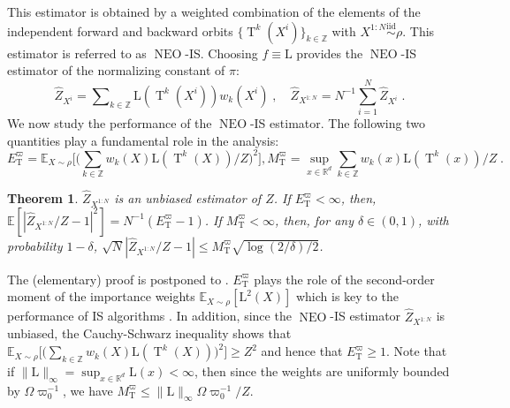 \documentclass{article}
\newtheorem{theorem}{Theorem}
\def\simiid{\overset{\operatorname{iid}}{\sim}}
\def\IFIS{\ensuremath{\operatorname{NEO}}}
\def\InFiNE{{\small \IFIS}}
\def\NEO{{\small \IFIS}}
\def\transfo{\operatorname{T}}
\def\PE{\mathbb{E}}
\def\rset{\mathbb{R}}
\def\eqsp{\,}
\def\eqsp{\;}
\newcommand{\1}{\mathds{1}}
\def\target{\pi}
\def\proposal{\rho}
\newcommand{\chunku}[3]{#1^{#2:#3}}
\def\const{Z}
\newcommand{\estConstC}[1]{\widehat{Z}_{#1}}
\def\rset{\mathbb{R}}
\def\zset{\mathbb{Z}}
\def\likelihood{\mathrm{L}}
\def\bound{M_{\transfo}^{\varpi}}
\begin{document}
This estimator is obtained by a weighted combination of  the elements of the independent forward and backward orbits $\{\transfo^k(X^i)\}_{k \in\zset}$ with $X^{1:N} \simiid \proposal$. This estimator is referred to as \NEO-IS. Choosing $f\equiv \likelihood$ provides the \InFiNE-IS estimator of the normalizing constant of $\target$:
\vspace{-0.05cm}
\begin{equation}  
\label{eq:def_estimator_normal_const} 
\textstyle \estConstC{X^i}=\sum\nolimits_{k\in\zset}\likelihood(\transfo^{k}(X^i))w_k(X^i)\eqsp, \quad
 \estConstC{X^{1:N}}=N^{-1}\sum_{i=1}^{N} \estConstC{X^i} \eqsp.
\end{equation}
We  now study the performance of the \NEO-IS estimator. The following two quantities play a fundamental role in the analysis:
\begin{equation}
\label{eq:bound_z_infine}
\textstyle E^{\varpi} _{\transfo} = \PE_{X \sim \rho}\big[\big(\sum_{k\in\zset}w_k(X) \likelihood(\transfo^k(X))/\const\big)^2\big], 
    \bound = \sup_{x\in\rset^d}\sum_{k\in\zset}w_k(x)\likelihood(\transfo^k(x))/\const\eqsp.
\end{equation}
\begin{theorem}
\label{theo:clt_const_infine}
$\estConstC{\chunku{X}{1}{N}}$ is an unbiased estimator of $\const$. If $E^{\varpi} _{\transfo}<\infty$, then,
    $\PE[|\estConstC{\chunku{X}{1}{N}}/\const-1|^2] = N^{-1} (E^{\varpi} _{\transfo}-1)$. If $\bound < \infty$, then, for any $\delta \in (0,1)$, with probability $1-\delta$, $\sqrt{N} \left|\estConstC{\chunku{X}{1}{N}}/\const - 1\right| \leq \bound \sqrt{\log(2/\delta)/2}$.
\end{theorem}
The (elementary) proof is postponed to . $ E^{\varpi} _{\transfo}$ plays the role of the second-order moment of the importance weights $\PE_{X \sim \proposal} [\likelihood^2(X)]$ which is key to the performance of IS algorithms \cite{agapiou2017importance,akyildiz2021convergence}. In addition, since the \NEO-IS estimator  $\estConstC{\chunku{X}{1}{N}}$ is unbiased, the Cauchy-Schwarz inequality shows that $\PE_{X \sim \rho}\big[\big(\sum_{k\in\zset}w_k(X) \likelihood(\transfo^k(X)) )^2\big] \geq \const^2$ and hence that $ E^{\varpi} _{\transfo} \geq 1$.
Note that if $\| \likelihood \|_\infty= \sup_{x \in \rset^d} \likelihood(x) < \infty$, then since the weights are uniformly bounded by $\Omega\varpi_0^{-1}$, we have $M^{\varpi} _{\transfo}\leq \|\likelihood\|_\infty\Omega\varpi_0^{-1}/\const$.
\end{document}
